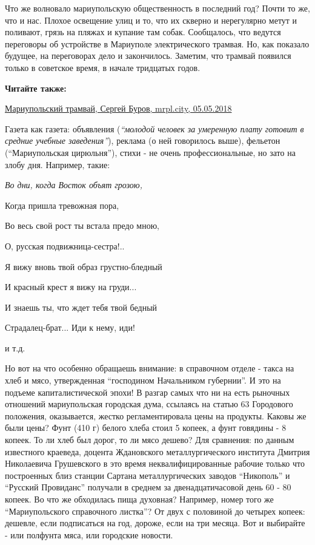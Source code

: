 
Что же волновало мариупольскую общественность в последний год? Почти то же, что
и нас. Плохое освещение улиц и то, что их скверно и нерегулярно метут и
по­ливают, грязь на пляжах и купание там собак. Сообщалось, что ведутся
переговоры об устройстве в Мариуполе элект­рического трамвая. Но, как показало
будущее, на переговорах дело и закончилось. Заметим, что трамвай появился
только в советское время, в начале тридцатых годов.

\textbf{Читайте также:} 

\href{https://archive.org/details/05_05_2018.sergij_burov.mrpl_city.mariupolskij_tramvaj}{Мариупольский трамвай, Сергей Буров, mrpl.city, 05.05.2018}

Газета как газета: объявления (\emph{\enquote{молодой человек за умеренную плату готовит в
средние учебные заведения}}), реклама (о ней говорилось выше), фельетон
(\enquote{Мариупольская цирюльня}), стихи - не очень профессиональные, но зато на злобу
дня. Например, такие:

\begin{center}
{\em
Во дни, когда Восток объят грозою,

Когда пришла тревожная пора,

Во весь свой рост ты встала предо мною,

О, русская подвижница-сестра!..

Я вижу вновь твой образ грустно-бледный

И красный крест я вижу на груди...

И знаешь ты, что ждет тебя твой бедный

Страдалец-брат... Иди к нему, иди!} и т.д.
\end{center}

Но вот на что особенно обращаешь внимание: в справочном отделе - такса на хлеб
и мясо, утвержденная \enquote{господином Начальником губернии}. И это на подъеме
капиталистической эпохи! В разгар самых что ни на есть рыночных отношений
мариупольская городская дума, ссылаясь на статью 63 Городового положения,
оказывается, жестко регламентировала цены на продукты. Каковы же были цены?
Фунт (410 г) белого хлеба стоил 5 копеек, а фунт говядины - 8 копеек. То ли
хлеб был дорог, то ли мясо дешево? Для сравнения: по данным известного
краеведа, доцента Ждановского металлургического института Дмитрия Николаевича
Грушевского в это время неквалифицированные рабочие только что построенных близ
станции Сартана металлургических заводов \enquote{Никополь} и \enquote{Русский Провиданс}
получали в среднем за двенадцатичасовой день 60 - 80 копеек. Во что же
обходилась пища духовная? Например, номер того же \enquote{Мариупольского справочного
листка}? От двух с половиной до четырех копеек: дешевле, если подписаться на
год, дороже, если на три месяца. Вот и выбирайте - или полфунта мяса, или
городские новости.

